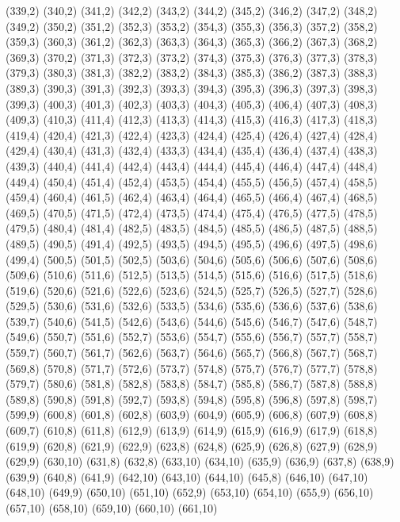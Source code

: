 (339,2)
(340,2)
(341,2)
(342,2)
(343,2)
(344,2)
(345,2)
(346,2)
(347,2)
(348,2)
(349,2)
(350,2)
(351,2)
(352,3)
(353,2)
(354,3)
(355,3)
(356,3)
(357,2)
(358,2)
(359,3)
(360,3)
(361,2)
(362,3)
(363,3)
(364,3)
(365,3)
(366,2)
(367,3)
(368,2)
(369,3)
(370,2)
(371,3)
(372,3)
(373,2)
(374,3)
(375,3)
(376,3)
(377,3)
(378,3)
(379,3)
(380,3)
(381,3)
(382,2)
(383,2)
(384,3)
(385,3)
(386,2)
(387,3)
(388,3)
(389,3)
(390,3)
(391,3)
(392,3)
(393,3)
(394,3)
(395,3)
(396,3)
(397,3)
(398,3)
(399,3)
(400,3)
(401,3)
(402,3)
(403,3)
(404,3)
(405,3)
(406,4)
(407,3)
(408,3)
(409,3)
(410,3)
(411,4)
(412,3)
(413,3)
(414,3)
(415,3)
(416,3)
(417,3)
(418,3)
(419,4)
(420,4)
(421,3)
(422,4)
(423,3)
(424,4)
(425,4)
(426,4)
(427,4)
(428,4)
(429,4)
(430,4)
(431,3)
(432,4)
(433,3)
(434,4)
(435,4)
(436,4)
(437,4)
(438,3)
(439,3)
(440,4)
(441,4)
(442,4)
(443,4)
(444,4)
(445,4)
(446,4)
(447,4)
(448,4)
(449,4)
(450,4)
(451,4)
(452,4)
(453,5)
(454,4)
(455,5)
(456,5)
(457,4)
(458,5)
(459,4)
(460,4)
(461,5)
(462,4)
(463,4)
(464,4)
(465,5)
(466,4)
(467,4)
(468,5)
(469,5)
(470,5)
(471,5)
(472,4)
(473,5)
(474,4)
(475,4)
(476,5)
(477,5)
(478,5)
(479,5)
(480,4)
(481,4)
(482,5)
(483,5)
(484,5)
(485,5)
(486,5)
(487,5)
(488,5)
(489,5)
(490,5)
(491,4)
(492,5)
(493,5)
(494,5)
(495,5)
(496,6)
(497,5)
(498,6)
(499,4)
(500,5)
(501,5)
(502,5)
(503,6)
(504,6)
(505,6)
(506,6)
(507,6)
(508,6)
(509,6)
(510,6)
(511,6)
(512,5)
(513,5)
(514,5)
(515,6)
(516,6)
(517,5)
(518,6)
(519,6)
(520,6)
(521,6)
(522,6)
(523,6)
(524,5)
(525,7)
(526,5)
(527,7)
(528,6)
(529,5)
(530,6)
(531,6)
(532,6)
(533,5)
(534,6)
(535,6)
(536,6)
(537,6)
(538,6)
(539,7)
(540,6)
(541,5)
(542,6)
(543,6)
(544,6)
(545,6)
(546,7)
(547,6)
(548,7)
(549,6)
(550,7)
(551,6)
(552,7)
(553,6)
(554,7)
(555,6)
(556,7)
(557,7)
(558,7)
(559,7)
(560,7)
(561,7)
(562,6)
(563,7)
(564,6)
(565,7)
(566,8)
(567,7)
(568,7)
(569,8)
(570,8)
(571,7)
(572,6)
(573,7)
(574,8)
(575,7)
(576,7)
(577,7)
(578,8)
(579,7)
(580,6)
(581,8)
(582,8)
(583,8)
(584,7)
(585,8)
(586,7)
(587,8)
(588,8)
(589,8)
(590,8)
(591,8)
(592,7)
(593,8)
(594,8)
(595,8)
(596,8)
(597,8)
(598,7)
(599,9)
(600,8)
(601,8)
(602,8)
(603,9)
(604,9)
(605,9)
(606,8)
(607,9)
(608,8)
(609,7)
(610,8)
(611,8)
(612,9)
(613,9)
(614,9)
(615,9)
(616,9)
(617,9)
(618,8)
(619,9)
(620,8)
(621,9)
(622,9)
(623,8)
(624,8)
(625,9)
(626,8)
(627,9)
(628,9)
(629,9)
(630,10)
(631,8)
(632,8)
(633,10)
(634,10)
(635,9)
(636,9)
(637,8)
(638,9)
(639,9)
(640,8)
(641,9)
(642,10)
(643,10)
(644,10)
(645,8)
(646,10)
(647,10)
(648,10)
(649,9)
(650,10)
(651,10)
(652,9)
(653,10)
(654,10)
(655,9)
(656,10)
(657,10)
(658,10)
(659,10)
(660,10)
(661,10)
